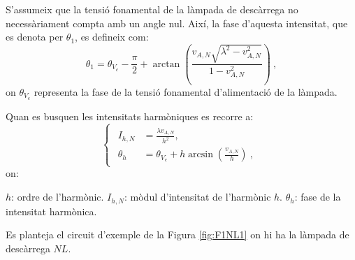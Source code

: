 S'assumeix que la tensió fonamental de la làmpada de descàrrega no necessàriament compta amb un angle nul. Així, la fase d'aquesta intensitat, que es denota per $\theta_1$, es defineix com:
\begin{equation}
    \theta_1=\theta_{V_c}-\frac{\pi}{2}+\arctan\left(\frac{v_{A,N}\sqrt{\lambda^2-v^2_{A,N}}}{1-v^2_{A,N}}\right)\ ,
    \label{eq:NL2}
\end{equation}
on $\theta_{V_c}$ representa la fase de la tensió fonamental d'alimentació de la làmpada. 

Quan es busquen les intensitats harmòniques es recorre a:
\begin{equation}
    \begin{cases}
    \begin{split}
        I_{h,N}&=\frac{\lambda v_{A,N}}{h^2},\\
        \theta_h&=\theta_{V_c}+h\arcsin\left(\frac{v_{A,N}}{h}\right)\ ,
    \end{split}
\end{cases}
    \label{eq:NL3}
\end{equation}
on:

$h$: ordre de l'harmònic.
\vs
$I_{h,N}$: mòdul d'intensitat de l'harmònic $h$.
\vs
$\theta_h$: fase de la intensitat harmònica.

Es planteja el circuit d'exemple de la Figura \ref{fig:F1NL1} on hi ha la làmpada de descàrrega $NL$.

